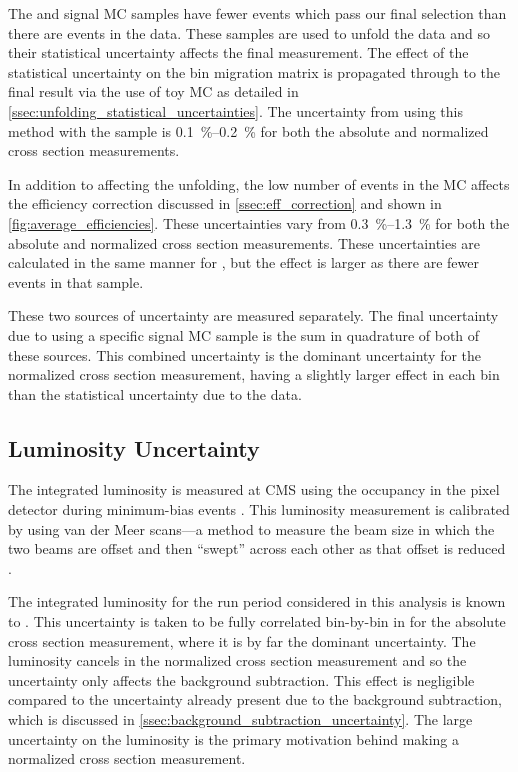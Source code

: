 The \MADGRAPH and \POWHEG signal MC samples have fewer events which pass our
final selection than there are events in the data. These samples are used to
unfold the data and so their statistical uncertainty affects the final
measurement. The effect of the statistical uncertainty on the bin migration
matrix is propagated through to the final result via the use of toy MC as
detailed in \cref{ssec:unfolding_statistical_uncertainties}. The uncertainty
from using this method with the \MADGRAPH sample is
\SIrange{0.1}{0.2}{\percent} for both the absolute and normalized cross section
measurements.

In addition to affecting the unfolding, the low number of events in the MC
affects the efficiency correction discussed in \cref{ssec:eff_correction} and
shown in \cref{fig:average_efficiencies}. These uncertainties vary from
\SIrange{0.3}{1.3}{\percent} for both the absolute and normalized cross section
measurements. These uncertainties are calculated in the same manner for
\POWHEG, but the effect is larger as there are fewer events in that sample.

These two sources of uncertainty are measured separately. The final uncertainty
due to using a specific signal MC sample is the sum in quadrature of both of
these sources. This combined uncertainty is the dominant uncertainty for the
normalized cross section measurement, having a slightly larger effect in each
\phistar bin than the statistical uncertainty due to the data.

\subsection{Luminosity Uncertainty}
\label{ssec:lumi_uncertainty}

The integrated luminosity is measured at CMS using the occupancy in the pixel
detector during minimum-bias events \cite{cms_lumi_2013}. This luminosity
measurement is calibrated by using van der Meer scans---a method to measure the
beam size in which the two beams are offset and then ``swept'' across each
other as that offset is reduced \cite{vandermeer_1968}.

The integrated luminosity for the run period considered in this analysis is
known to \LumiUncertainty. This uncertainty is taken to be fully correlated
bin-by-bin in \phistar for the absolute cross section measurement, where it is
by far the dominant uncertainty. The luminosity cancels in the normalized
cross section measurement and so the uncertainty only affects the background
subtraction. This effect is negligible compared to the uncertainty already
present due to the background subtraction, which is discussed in
\cref{ssec:background_subtraction_uncertainty}. The large uncertainty on
the luminosity is the primary motivation behind making a normalized cross
section measurement.


